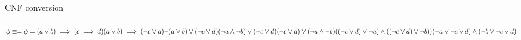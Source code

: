 \documentclass[a4paper, 14pt]{amsart}
\begin{document}
CNF conversion
\\
\\
$
\phi \equiv =
\iffalse
(a v b) -> (c -> d)
(a v b) -> (~c v d)
~(a v b) v (~c v d)
(~a & ~b) v (~c v d)
(~c v d) v (~a & ~b)
((~c v d) v ~a) & ((~c v d) v ~b)
(~a v ~c v d) & (~b v ~c v d)
\fi
\\
\phi = (a \vee b) \implies (c \implies d)
\\
(a \vee b) \implies (\neg c \vee d)
\\
\neg (a \vee b) \vee (\neg c \vee d)
\\
(\neg a \wedge \neg b) \vee (\neg c \vee d)
\\
(\neg c \vee d) \vee (\neg a \wedge \neg b)
\\
((\neg c \vee d) \vee \neg a) \wedge ((\neg c \vee d) \vee \neg b))
\\
(\neg a \vee \neg c \vee d) \wedge (\neg b \vee \neg c \vee d)
$
\\
\end{document}
